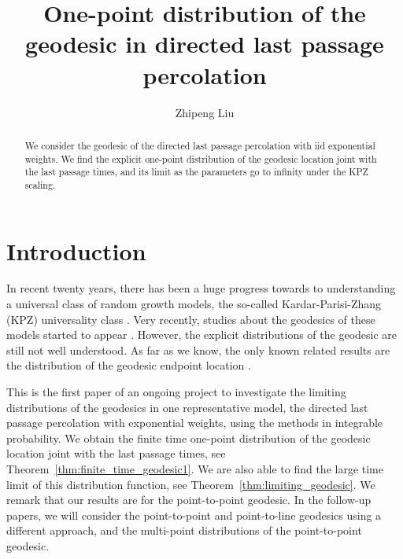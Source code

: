 \documentclass{article}
\numberwithin{equation}{section}
\begin{document}
\title{One-point distribution of the geodesic in directed last passage percolation}


\author{Zhipeng Liu}
\maketitle

\begin{abstract}
	We consider the geodesic of the directed last passage percolation with iid exponential weights. We find the explicit one-point distribution of the geodesic location joint with the last passage times, and its limit as the parameters go to infinity under the KPZ scaling. 
\end{abstract}

\section{Introduction}

In recent twenty years, there has been a huge progress towards to understanding a universal class of random growth models, the so-called Kardar-Parisi-Zhang (KPZ) universality class \cite{Baik-Deift-Johansson99,Johansson00,Johansson03,Borodin-Ferrari-Prahofer-Sasamoto07,Tracy-Widom08,Tracy-Widom09,Borodin-Corwin13,Matetski-Quastel-Remenik17,Dauvergne-Ortmann-Virag18,Johansson-Rahman19,Liu19}. Very recently, studies about the geodesics of these models started to appear \cite{Basu-Sarkar-Sly17,Hammond20,Hammond-Sarkar20,Basu-Hoffman-Sly18,Basu-Ganguly-Hammon19,Bates-Ganguly-Hammond19b,Busani-Ferrari20,Dauvergne-Sarkar-Virag20,Corwin-Hammond-Hegde-Matetski21,Dauvergne-Virag21}. However, the explicit distributions of the geodesic are still not well understood. As far as we know, the only known related results are the distribution of the geodesic endpoint location \cite{MorenoFlores-Quastel-Remenik13,Schehr12,Baik-Liechty-Schehr12}. 

This is the first paper of an ongoing project to investigate the limiting distributions of the geodesics in one representative model, the directed last passage percolation with exponential weights, using the methods in integrable probability. We obtain the finite time one-point distribution of the geodesic location joint with the last passage times, see Theorem~\ref{thm:finite_time_geodesic1}. We are also able to find the large time limit of this distribution function, see Theorem~\ref{thm:limiting_geodesic}. We remark that our results are for the point-to-point geodesic. In the follow-up papers, we will consider the point-to-point and point-to-line geodesics using a different approach, and the multi-point distributions of the point-to-point geodesic.
\end{document}

